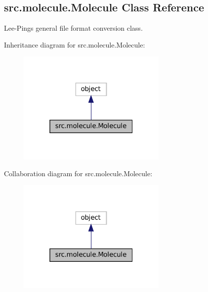 \hypertarget{classsrc_1_1molecule_1_1Molecule}{}\subsection{src.\+molecule.\+Molecule Class Reference}
\label{classsrc_1_1molecule_1_1Molecule}


Lee-\/\+Ping\textquotesingle{}s general file format conversion class.  




Inheritance diagram for src.\+molecule.\+Molecule\+:
\nopagebreak
\begin{figure}[H]
\begin{center}
\leavevmode
\includegraphics[width=205pt]{classsrc_1_1molecule_1_1Molecule__inherit__graph}
\end{center}
\end{figure}


Collaboration diagram for src.\+molecule.\+Molecule\+:
\nopagebreak
\begin{figure}[H]
\begin{center}
\leavevmode
\includegraphics[width=205pt]{classsrc_1_1molecule_1_1Molecule__coll__graph}
\end{center}
\end{figure}
